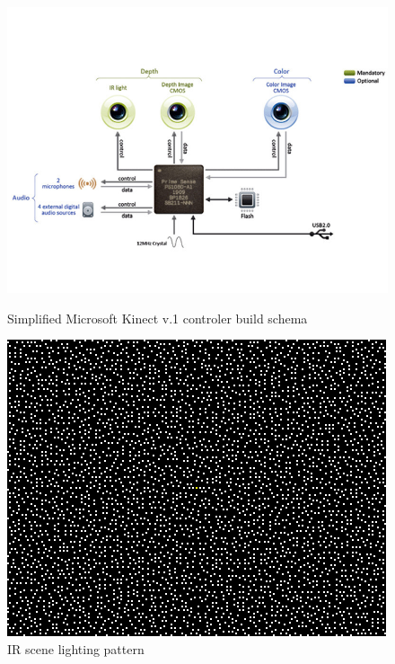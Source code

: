 \documentclass{llncs}
\begin{document}
\begin{figure}[h!]
	\centering 
	\begin{minipage}[b]{0.49\linewidth}
		\centering
		\includegraphics[width=\textwidth]{Images/kinectSchema}
		\caption[]{Simplified Microsoft Kinect v.1 controler build schema \cite{kinectFixit2016}}
		\label{fig:characteristics:kinect:inside} 
	\end{minipage}
	\begin{minipage}[b]{0.49\linewidth}
		\centering 
		\includegraphics[width=\textwidth]{Images/kinect-pattern_3x3}
		\caption[]{IR scene lighting pattern\cite{reichinger2011}}
		\label{fig:characteristics:kinect:dotPattern}
	\end{minipage}
\end{figure}
		
\end{document}
